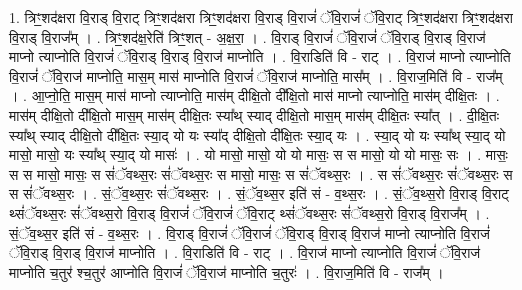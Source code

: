 \documentclass[17pt]{extarticle}
\begin{document}
1. त्रिꣳ॒॒शद॑क्षरा वि॒राड् वि॒राट् त्रिꣳ॒॒शद॑क्षरा त्रिꣳ॒॒शद॑क्षरा वि॒राड् वि॒राजं॑ ॅवि॒राजं॑ ॅवि॒राट् त्रिꣳ॒॒शद॑क्षरा त्रिꣳ॒॒शद॑क्षरा वि॒राड् वि॒राज᳚म् । . त्रिꣳ॒॒शद॑क्ष॒रेति॑ त्रिꣳ॒॒शत् - अ॒क्ष॒रा॒ । . वि॒राड् वि॒राजं॑ ॅवि॒राजं॑ ॅवि॒राड् वि॒राड् वि॒राज॑ माप्नो त्याप्नोति वि॒राजं॑ ॅवि॒राड् वि॒राड् वि॒राज॑ माप्नोति । . वि॒राडिति॑ वि - राट् । . वि॒राज॑ माप्नो त्याप्नोति वि॒राजं॑ ॅवि॒राज॑ माप्नोति॒ मास॒म् मास॑ माप्नोति वि॒राजं॑ ॅवि॒राज॑ माप्नोति॒ मास᳚म् । . वि॒राज॒मिति॑ वि - राज᳚म् । . आ॒प्नो॒ति॒ मास॒म् मास॑ माप्नो त्याप्नोति॒ मास॑म् दीक्षि॒तो दी᳚क्षि॒तो मास॑ माप्नो त्याप्नोति॒ मास॑म् दीक्षि॒तः । . मास॑म् दीक्षि॒तो दी᳚क्षि॒तो मास॒म् मास॑म् दीक्षि॒तः स्या᳚थ् स्याद् दीक्षि॒तो मास॒म् मास॑म् दीक्षि॒तः स्या᳚त् । . दी॒क्षि॒तः स्या᳚थ् स्याद् दीक्षि॒तो दी᳚क्षि॒तः स्या॒द् यो यः स्या᳚द् दीक्षि॒तो दी᳚क्षि॒तः स्या॒द् यः । . स्या॒द् यो यः स्या᳚थ् स्या॒द् यो मासो॒ मासो॒ यः स्या᳚थ् स्या॒द् यो मासः॑ । . यो मासो॒ मासो॒ यो यो मासः॒ स स मासो॒ यो यो मासः॒ सः । . मासः॒ स स मासो॒ मासः॒ स सं॑ॅवथ्स॒रः सं॑ॅवथ्स॒रः स मासो॒ मासः॒ स सं॑ॅवथ्स॒रः । . स सं॑ॅवथ्स॒रः सं॑ॅवथ्स॒रः स स सं॑ॅवथ्स॒रः । . सं॒ॅव॒थ्स॒रः सं॑ॅवथ्स॒रः । . सं॒ॅव॒थ्स॒र इति॑ सं - व॒थ्स॒रः । . सं॒ॅव॒थ्स॒रो वि॒राड् वि॒राट् थ्सं॑ॅवथ्स॒रः सं॑ॅवथ्स॒रो वि॒राड् वि॒राजं॑ ॅवि॒राजं॑ ॅवि॒राट् 
थ्सं॑ॅवथ्स॒रः सं॑ॅवथ्स॒रो वि॒राड् वि॒राज᳚म् । . सं॒ॅव॒थ्स॒र इति॑ सं - व॒थ्स॒रः । . वि॒राड् वि॒राजं॑ ॅवि॒राजं॑ ॅवि॒राड् वि॒राड् वि॒राज॑ माप्नो त्याप्नोति वि॒राजं॑ ॅवि॒राड् वि॒राड् वि॒राज॑ माप्नोति । . वि॒राडिति॑ वि - राट् । . वि॒राज॑ माप्नो त्याप्नोति वि॒राजं॑ ॅवि॒राज॑ माप्नोति च॒तुर॑ श्च॒तुर॑ आप्नोति वि॒राजं॑ ॅवि॒राज॑ माप्नोति च॒तुरः॑ । . वि॒राज॒मिति॑ वि - राज᳚म् । \newline
\end{document}
